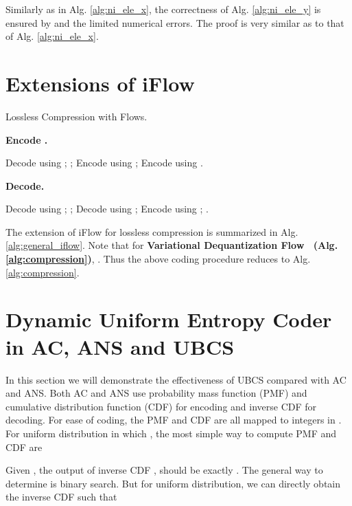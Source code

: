 \documentclass{article}
\begin{document}
Similarly as in Alg. \ref{alg:ni_ele_x}, the correctness of Alg. \ref{alg:ni_ele_y} is ensured by  and the limited numerical errors. The proof is very similar as to that of Alg. \ref{alg:ni_ele_x}.

\section{Extensions of iFlow}

\begin{algorithm}[ht]
\small
\caption{Lossless Compression with Flows.}
\begin{multicols}{2} 
\textbf{Encode .} 

\begin{algorithmic}[1]
\STATE Decode  using ;
\STATE ;
\STATE Encode  using ;
\STATE Encode  using .
\end{algorithmic}

\textbf{Decode.} 

\begin{algorithmic}[1]
\STATE Decode  using ;
\STATE ;
\STATE Decode  using ;
\STATE Encode  using ;
\RETURN .
\end{algorithmic}
\end{multicols}
\vspace{-8pt}
\label{alg:general_iflow}
\end{algorithm}

The extension of iFlow for lossless compression is summarized in Alg. \ref{alg:general_iflow}. Note that for \textbf{Variational Dequantization Flow~\cite{hoogeboom2020learning,ho2019compression} (Alg. \ref{alg:compression})}, . Thus the above coding procedure reduces to Alg. \ref{alg:compression}.

\section{Dynamic Uniform Entropy Coder in AC, ANS and UBCS}

In this section we will demonstrate the effectiveness of UBCS compared with AC and ANS. Both AC and ANS use probability mass function (PMF) and cumulative distribution function (CDF) for encoding and inverse CDF for decoding. For ease of coding, the PMF and CDF are all mapped to integers in . For uniform distribution  in which , the most simple way to compute PMF and CDF are


Given , the output of inverse CDF , should be exactly . The general way to determine  is binary search. But for uniform distribution, we can directly obtain the inverse CDF such that
\end{document}
